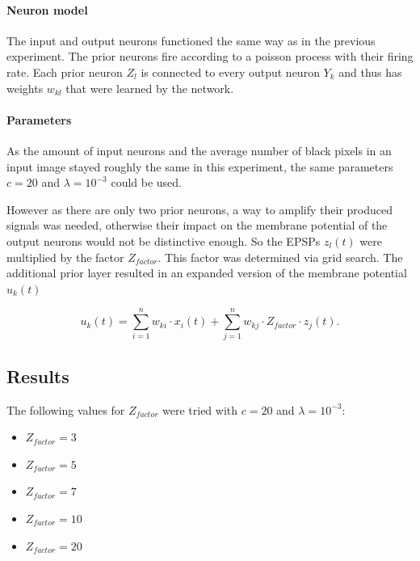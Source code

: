 \paragraph{Neuron model}
The input and output neurons functioned the same way as in the previous experiment. The prior neurons fire according to a poisson process with their firing rate. Each prior neuron $Z_l$ is connected to every output neuron $Y_k$ and thus has weights $w_{kl}$ that were learned by the network. 

\paragraph{Parameters}
As the amount of input neurons and the average number of black pixels in an input image stayed roughly the same in this experiment, the same parameters $c=  20$ and $\lambda = 10^{-3}$ could be used.

 However as there are only two prior neurons, a way to amplify their produced signals was needed, otherwise their impact on the membrane potential of the output neurons would not be distinctive enough. So the EPSPs $z_l(t)$ were multiplied by the factor $Z_{factor}$. This factor was determined via grid search. The additional prior layer resulted in an expanded version of the membrane potential $u_k(t)$

\begin{equation}
\label{eqn:ukHorvert}
u_k(t) = \sum_{i=1}^n w_{ki} \cdot x_i(t) + \sum_{j=1}^n w_{kj} \cdot Z_{factor} \cdot z_j(t).
\end{equation}


\subsection{Results} 

The following values for $Z_{factor} $ were tried with $c = 20$ and $\lambda = 10^{-3}$:
\begin{itemize}
  \item $Z_{factor} = 3$
  \item $Z_{factor} = 5$
  \item $Z_{factor} = 7$  
  \item $Z_{factor} = 10$ 
  \item $Z_{factor} = 20$
\end{itemize}

